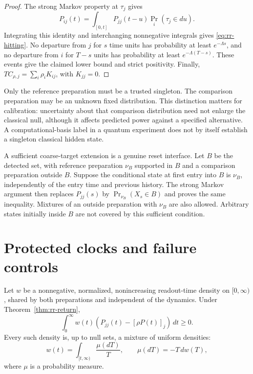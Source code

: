 \begin{proof}
The strong Markov property at $\tau_j$ gives
\[
 P_{ij}(t)=\int_{[0,t]}P_{jj}(t-u)\Pr_i(\tau_j\in du).
\]
Integrating this identity and interchanging nonnegative integrals gives
\eqref{eq:rr-hitting}.  No departure from $j$ for $s$ time units has probability
at least $e^{-\Lambda s}$, and no departure from $i$ for $T-s$ units has
probability at least $e^{-\Lambda(T-s)}$.  These events give the claimed lower
bound and strict positivity.  Finally,
$T C_{\rho,j}=\sum_i\rho_iK_{ij}$, with $K_{jj}=0$.
\end{proof}

Only the reference preparation must be a trusted singleton.  The comparison
preparation may be an unknown fixed distribution.  This distinction matters for
calibration: uncertainty about that comparison distribution need not enlarge
the classical null, although it affects predicted power against a specified
alternative.  A computational-basis label in a quantum experiment does not by
itself establish a singleton classical hidden state.

A sufficient coarse-target extension is a genuine reset interface.  Let $B$ be
the detected set, with reference preparation $\nu_B$ supported in $B$ and a
comparison preparation outside $B$.  Suppose the conditional state at first
entry into $B$ is $\nu_B$, independently of the entry time and previous history.
The strong Markov argument then replaces $P_{jj}(s)$ by
$\Pr_{\nu_B}(X_s\in B)$ and proves the same inequality.  Mixtures of an outside
preparation with $\nu_B$ are also allowed.  Arbitrary states initially inside
$B$ are not covered by this sufficient condition.

\section{Protected clocks and failure controls}
\label{sec:rr-clocks}

\begin{theorem}
\label{thm:rr-decreasing}
Let $w$ be a nonnegative, normalized, nonincreasing readout-time density on
$[0,\infty)$, shared by both preparations and independent of the dynamics.
Under Theorem~\ref{thm:rr-return},
\[
 \int_0^\infty w(t)
 \left(P_{jj}(t)-[\rho P(t)]_j\right)\,dt\ge0.
\]
Every such density is, up to null sets, a mixture of uniform densities:
\begin{equation}
 w(t)=\int_{[t,\infty)}\frac{\mu(dT)}{T},
 \qquad \mu(dT)=-T\,dw(T),
 \label{eq:rr-mixture}
\end{equation}
where $\mu$ is a probability measure.
\end{theorem}

